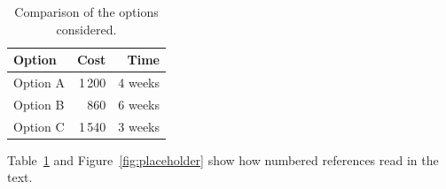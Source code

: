 \begin{table}[H]
    \centering
    \caption{Comparison of the options considered.}
    \label{tab:example}
    \begin{tabular}{lrr}
        \toprule
        \textbf{Option} & \textbf{Cost} & \textbf{Time} \\
        \midrule
        Option A        & 1\,200       & 4 weeks      \\
        Option B        & 860          & 6 weeks      \\
        Option C        & 1\,540       & 3 weeks      \\
        \bottomrule
    \end{tabular}
\end{table}

Table~\ref{tab:example} and Figure~\ref{fig:placeholder} show how numbered
references read in the text.
